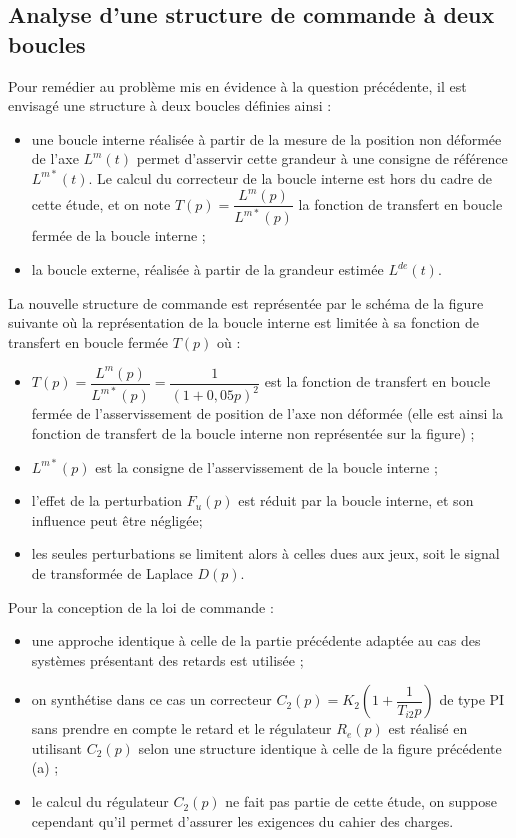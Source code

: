 \subsection*{Analyse d’une structure de commande à deux boucles}
\ifprof
\else
Pour remédier au problème mis en évidence à la question précédente, il est envisagé une structure à deux boucles définies ainsi :
\begin{itemize}
\item une boucle interne réalisée à partir de la mesure de la position non déformée de l’axe $L^m(t)$ permet d’asservir cette grandeur à une consigne de référence $L^{m*}(t)$. Le calcul du correcteur de la boucle interne est hors du cadre de cette étude, et on note $T(p)=\dfrac{L^m(p)}{L^{m*}(p)}$ la fonction de transfert en boucle fermée de la boucle
interne ;
\item la boucle externe, réalisée à partir de la grandeur estimée $L^{de}(t)$.
\end{itemize}
La nouvelle structure de commande est représentée par le schéma de la figure suivante où la représentation de la
boucle interne est limitée à sa fonction de transfert en boucle fermée $T(p)$ où :
\begin{itemize}
\item $T(p) = \dfrac{L^m(p)}{L^{m*}(p)}= \dfrac{1}{\left(1+0,05p\right)^2}$ est la fonction de transfert en boucle fermée de l’asservissement de position de l’axe non déformée (elle est ainsi la fonction de transfert de la boucle interne non représentée sur la figure) ;
\item $L^{m*}(p)$ est la consigne de l’asservissement de la boucle interne ;
\item l’effet de la perturbation $F_u(p)$ est réduit par la boucle interne, et son influence peut être négligée;
\item les seules perturbations se limitent alors à celles dues aux jeux, soit le signal de transformée de Laplace $D(p)$.
\end{itemize}
Pour la conception de la loi de commande :
\begin{itemize}
\item une approche identique à celle de la partie précédente adaptée au cas des systèmes présentant des retards est utilisée ;
\item on synthétise dans ce cas un correcteur $C_2(p) = K_2 \left( 1+\dfrac{1}{T_{i2}p}\right) $ de type PI sans prendre en compte le retard et le régulateur $R_e(p)$ est réalisé en utilisant $C_2(p)$ selon une structure identique à celle de la figure précédente (a) ;
\item le calcul du régulateur $C_2(p)$ ne fait pas partie de cette étude, on suppose cependant qu’il permet d’assurer les exigences du cahier des charges.
\end{itemize}


